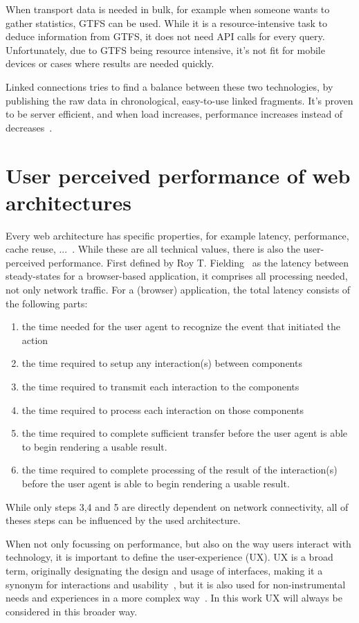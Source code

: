 \documentclass[twocolumn]{phdsymp} %
\begin{document}
When transport data is needed in bulk, for example when someone wants to gather statistics, GTFS can be used. While it is a resource-intensive task to deduce information from GTFS, it does not need API calls for every query. Unfortunately, due to GTFS being resource intensive, it's not fit for mobile devices or cases where results are needed quickly.

Linked connections tries to find a balance between these two technologies, by publishing the raw data in chronological, easy-to-use linked fragments. It's proven to be server efficient, and when load increases, performance increases instead of decreases~\cite{colpaert17}.

\section{User perceived performance of web architectures}

Every web architecture has specific properties, for example latency, performance, cache reuse, ...~\cite{verborgh16}. While these are all technical values, there is also the user-perceived performance. First defined by Roy T. Fielding~\cite{fielding99} as the latency between steady-states for a browser-based application, it comprises all processing needed, not only network traffic. For a (browser) application, the total latency consists of the following parts:
\begin{enumerate}
\item the time needed for the user agent to recognize the event that initiated the action
\item the time required to setup any interaction(s) between components
\item the time required to transmit each interaction to the components
\item the time required to process each interaction on those components
\item the time required to complete sufficient transfer before the user agent is able to begin rendering a usable result.
\item the time required to complete processing of the result of the interaction(s) before the user agent is able to begin rendering a usable result.
\end{enumerate}

While only steps 3,4 and 5 are directly dependent on network connectivity, all of theses steps can be influenced by the used architecture.

When not only focussing on performance, but also on the way users interact with technology, it is important to define the user-experience (UX). UX is a broad term, originally designating the design and usage of interfaces, making it a synonym for interactions and usability~\cite{avila11}, but it is also used for non-instrumental needs and experiences in a more complex way~\cite{avila11}. In this work UX will always be considered in this broader way.
\end{document}
